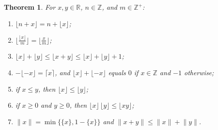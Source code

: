 \documentclass[11pt]{article}
\theoremstyle{ntstyle}
\newtheorem{theorem}{Theorem}[subsection]
\begin{document}
\begin{theorem}\label{thm:4.3.1} For
	$x, y\in\mathbb{R}$, $n\in\mathbb{Z}$, and $m\in\mathbb{Z}^+$:

	\begin{enumerate}[label={\alph*)}]
		\item $\lfloor n+x\rfloor = n + \lfloor x\rfloor$;
		\item $\big\lfloor \tfrac{\lfloor x\rfloor}{m}\big\rfloor =
			      \big\lfloor \tfrac{x}{m}\big\rfloor$;
		\item $\lfloor x\rfloor + \lfloor y\rfloor \le \lfloor x+y\rfloor
			      \le \lfloor x\rfloor + \lfloor y\rfloor + 1$;
		\item $-\lfloor -x\rfloor = \lceil x\rceil$, and $\lfloor x\rfloor
			      + \lfloor -x\rfloor$ equals $0$ if $x\in\mathbb{Z}$ and $-1$ otherwise;
		\item if $x\le y$, then $\lfloor x\rfloor \le \lfloor y\rfloor$;
		\item if $x\ge0$ and $y\ge0$, then $\lfloor x\rfloor\,\lfloor y\rfloor
			      \le \lfloor xy\rfloor$;
		\item $\lVert x\rVert = \min\{\{x\}, 1-\{x\}\}$ and $\lVert
			      x+y\rVert \le \lVert x\rVert + \lVert y\rVert$.
	\end{enumerate}

\end{theorem}
\end{document}
